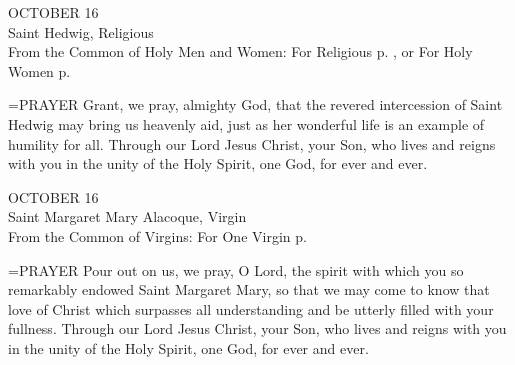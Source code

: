 \begin{center}\normalsize OCTOBER 16\\
\footnotesize Saint Hedwig, Religious\\
\footnotesize From the Common of Holy Men and Women: For Religious p.   , or For Holy\\
\footnotesize Women p. \\
\end{center}

\hangindent=\parindent \small{PRAYER 
Grant, we pray, almighty God,
that the revered intercession of Saint Hedwig
may bring us heavenly aid,
just as her wonderful life
is an example of humility for all.
Through our Lord Jesus Christ, your Son,
who lives and reigns with you in the unity of the Holy Spirit,
one God, for ever and ever.\\}
 
\begin{center}\normalsize OCTOBER 16\\
\footnotesize Saint Margaret Mary Alacoque, Virgin\\
\footnotesize From the Common of Virgins: For One Virgin p.\\
\end{center}

\hangindent=\parindent \small{PRAYER 
Pour out on us, we pray, O Lord,
the spirit with which you so remarkably endowed
Saint Margaret Mary,
so that we may come to know
that love of Christ which surpasses all understanding
and be utterly filled with your fullness.
Through our Lord Jesus Christ, your Son,
who lives and reigns with you in the unity of the Holy Spirit,
one God, for ever and ever.\\}
 
